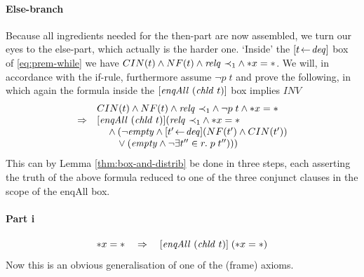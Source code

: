 \paragraph{Else-branch}
Because all ingredients needed for the then-part are now assembled, we turn our
eyes to the else-part, which actually is the harder one. `Inside' the $[t \!\gets\!
\mathit{deq}]$ box of \eqref{eq:prem-while}
we have $CIN(t) \land NF(t) \land \mathit{relq}~{\prec}_1 \land {\ast x} =  \ast$. We will, in accordance with the if-rule,
furthermore assume $\lnot p\;t$ and prove the following, in which again the formula
inside the $[\mathit{enqAll}~(\mathit{chld}~t)]$ box implies $INV$
\begin{equation}
\label{eq:prem-else}
\begin{array}{l@{\quad}l}
&  CIN(t) \land NF(t) \land \relq~{\prec}_1 \land \lnot p\;t \land \rd{x} =  \unit \\
\Rightarrow & [\enqAll~(\chld~t)](\relq~{\prec}_1 \land \rd{x} =  \unit   \\
&  \quad {}\land (\lnot \qmt \land [t' \leteq \deq](NF(t') \land CIN(t')) \\
& \qquad  {}\lor (\qmt \land \lnot \exists t''\in r\bnd p\;t'')))
\end{array}
\end{equation}
This can by Lemma \ref{thm:box-and-distrib} be done in three steps, each asserting
the truth of the above formula reduced to one of the three conjunct clauses in
the scope of the enqAll box.

\paragraph{Part i}
\[
{\ast x} = \ast \quad \Rightarrow 
\quad [\mathit{enqAll}~(\mathit{chld}~t)]\;({\ast x} =  \ast )
\]
Now this is an obvious generalisation of one of the (frame) axioms.


